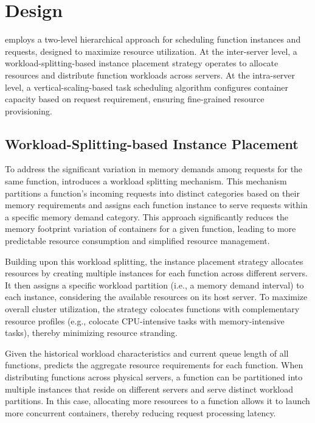 \section{\sysname Design}

\sysname employs a two-level hierarchical approach for scheduling function instances and requests, designed to maximize resource utilization.
At the inter-server level, a workload-splitting-based instance placement strategy operates to allocate resources and distribute function workloads across servers.
At the intra-server level, a vertical-scaling-based task scheduling algorithm configures container capacity based on request requirement, ensuring fine-grained resource provisioning.

\subsection{Workload-Splitting-based Instance Placement}

To address the significant variation in memory demands among requests for the same function, \sysname introduces a workload splitting mechanism.
This mechanism partitions a function's incoming requests into distinct categories based on their memory requirements and assigns each function instance to serve requests within a specific memory demand category.
This approach significantly reduces the memory footprint variation of containers for a given function, leading to more predictable resource consumption and simplified resource management.

Building upon this workload splitting, the instance placement strategy allocates resources by creating multiple instances for each function across different servers.
It then assigns a specific workload partition (i.e., a memory demand interval) to each instance, considering the available resources on its host server.
To maximize overall cluster utilization, the strategy colocates functions with complementary resource profiles (e.g., colocate CPU-intensive tasks with memory-intensive tasks), thereby minimizing resource stranding.

Given the historical workload characteristics and current queue length of all functions, \sysname predicts the aggregate resource requirements for each function.
When distributing functions across physical servers, a function can be partitioned into multiple instances that reside on different servers and serve distinct workload partitions.
In this case, allocating more resources to a function allows it to launch more concurrent containers, thereby reducing request processing latency.


